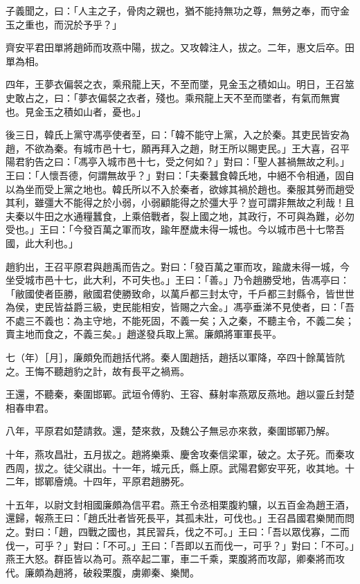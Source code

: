 \begin{pinyinscope}
子義聞之，曰：「人主之子，骨肉之親也，猶不能持無功之尊，無勞之奉，而守金玉之重也，而況於予乎？」

齊安平君田單將趙師而攻燕中陽，拔之。又攻韓注人，拔之。二年，惠文后卒。田單為相。

四年，王夢衣偏裻之衣，乘飛龍上天，不至而墜，見金玉之積如山。明日，王召筮史敢占之，曰：「夢衣偏裻之衣者，殘也。乘飛龍上天不至而墜者，有氣而無實也。見金玉之積如山者，憂也。」

後三日，韓氏上黨守馮亭使者至，曰：「韓不能守上黨，入之於秦。其吏民皆安為趙，不欲為秦。有城市邑十七，願再拜入之趙，財王所以賜吏民。」王大喜，召平陽君豹告之曰：「馮亭入城市邑十七，受之何如？」對曰：「聖人甚禍無故之利。」王曰：「人懷吾德，何謂無故乎？」對曰：「夫秦蠶食韓氏地，中絕不令相通，固自以為坐而受上黨之地也。韓氏所以不入於秦者，欲嫁其禍於趙也。秦服其勞而趙受其利，雖彊大不能得之於小弱，小弱顧能得之於彊大乎？豈可謂非無故之利哉！且夫秦以牛田之水通糧蠶食，上乘倍戰者，裂上國之地，其政行，不可與為難，必勿受也。」王曰：「今發百萬之軍而攻，踰年歷歲未得一城也。今以城市邑十七幣吾國，此大利也。」

趙豹出，王召平原君與趙禹而告之。對曰：「發百萬之軍而攻，踰歲未得一城，今坐受城市邑十七，此大利，不可失也。」王曰：「善。」乃令趙勝受地，告馮亭曰：「敝國使者臣勝，敝國君使勝致命，以萬戶都三封太守，千戶都三封縣令，皆世世為侯，吏民皆益爵三級，吏民能相安，皆賜之六金。」馮亭垂涕不見使者，曰：「吾不處三不義也：為主守地，不能死固，不義一矣；入之秦，不聽主令，不義二矣；賣主地而食之，不義三矣。」趙遂發兵取上黨。廉頗將軍軍長平。

七（年）［月］，廉頗免而趙括代將。秦人圍趙括，趙括以軍降，卒四十餘萬皆阬之。王悔不聽趙豹之計，故有長平之禍焉。

王還，不聽秦，秦圍邯鄲。武垣令傅豹、王容、蘇射率燕眾反燕地。趙以靈丘封楚相春申君。

八年，平原君如楚請救。還，楚來救，及魏公子無忌亦來救，秦圍邯鄲乃解。

十年，燕攻昌壯，五月拔之。趙將樂乘、慶舍攻秦信梁軍，破之。太子死。而秦攻西周，拔之。徒父祺出。十一年，城元氏，縣上原。武陽君鄭安平死，收其地。十二年，邯鄲廥燒。十四年，平原君趙勝死。

十五年，以尉文封相國廉頗為信平君。燕王令丞相栗腹約驤，以五百金為趙王酒，還歸，報燕王曰：「趙氏壯者皆死長平，其孤未壯，可伐也。」王召昌國君樂閒而問之。對曰：「趙，四戰之國也，其民習兵，伐之不可。」王曰：「吾以眾伐寡，二而伐一，可乎？」對曰：「不可。」王曰：「吾即以五而伐一，可乎？」對曰：「不可。」燕王大怒。群臣皆以為可。燕卒起二軍，車二千乘，栗腹將而攻鄗，卿秦將而攻代。廉頗為趙將，破殺栗腹，虜卿秦、樂閒。


\end{pinyinscope}

